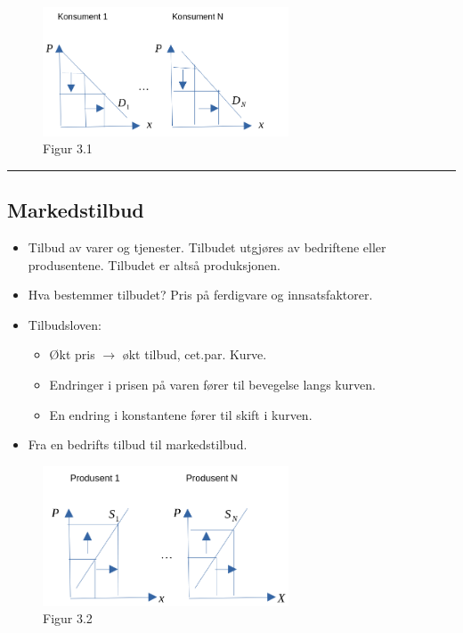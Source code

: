 \documentclass[
  letterpaper,
  DIV=11,
  numbers=noendperiod]{scrartcl}
\providecommand{\tightlist}{%
  \setlength{\itemsep}{0pt}\setlength{\parskip}{0pt}}\usepackage{longtable,booktabs,array}
\begin{document}
\begin{figure}[H]

{\centering \includegraphics[width=0.65\textwidth,height=\textheight]{drawio/ekurve.png}

}

\caption{Figur 3.1}

\end{figure}%

\begin{center}\rule{0.5\linewidth}{0.5pt}\end{center}

\subsection{Markedstilbud}\label{markedstilbud}

\begin{itemize}
\tightlist
\item
  Tilbud av varer og tjenester. Tilbudet utgjøres av bedriftene eller
  produsentene. Tilbudet er altså produksjonen.
\item
  Hva bestemmer tilbudet? Pris på ferdigvare og innsatsfaktorer.
\item
  Tilbudsloven:

  \begin{itemize}
  \tightlist
  \item
    Økt pris \(\rightarrow\) økt tilbud, cet.par. Kurve.
  \item
    Endringer i prisen på varen fører til bevegelse langs kurven.
  \item
    En endring i konstantene fører til skift i kurven.
  \end{itemize}
\item
  Fra en bedrifts tilbud til markedstilbud.
\end{itemize}

\begin{figure}[H]

{\centering \includegraphics[width=0.65\textwidth,height=\textheight]{drawio/tkurve.png}

}

\caption{Figur 3.2}

\end{figure}%
\end{document}

